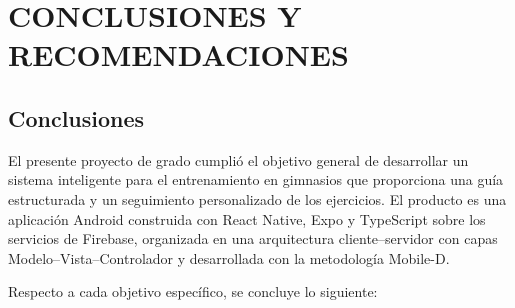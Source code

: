 \chapter{CONCLUSIONES Y RECOMENDACIONES}
\label{cap:conclusiones}

\section{Conclusiones}
\label{sec:conclusiones}

El presente proyecto de grado cumplió el objetivo general de desarrollar un
sistema inteligente para el entrenamiento en gimnasios que proporciona una guía
estructurada y un seguimiento personalizado de los ejercicios. El producto es
una aplicación Android construida con React Native, Expo y TypeScript sobre
los servicios de Firebase, organizada en una arquitectura cliente--servidor con
capas Modelo--Vista--Controlador y desarrollada con la metodología Mobile-D.

Respecto a cada objetivo específico, se concluye lo siguiente:

